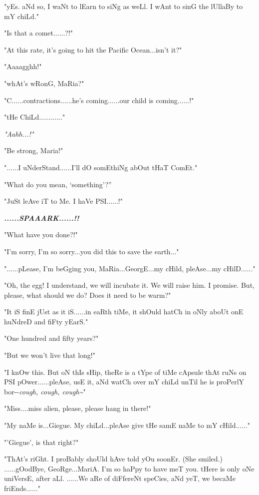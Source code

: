 \documentclass[
]{article}
\begin{document}
"yEs. aNd so, I waNt to lEarn to siNg as weLl. I wAnt to sinG the
lUllaBy to mY chiLd."

"Is that a comet......?!"

"At this rate, it's going to hit the Pacific Ocean...isn't it?"

"Aaaagghh!"

"whAt's wRonG, MaRia?"

"C......contractions......he's coming......our child is coming......!"

"tHe ChiLd............"

\emph{"Aahh...!"}

"Be strong, Maria!"

"......I uNderStand......I'll dO somEthiNg abOut tHaT ComEt."

"What do you mean, `something'?''

"JuSt leAve iT to Me. I haVe PSI......!"

\emph{\textbf{......SPAAARK......!!}}

"What have you done?!"

"I'm sorry, I'm so sorry...you did this to save the earth..."

"......pLease, I'm beGging you, MaRia...GeorgE...my cHild, pleAse...my
cHilD......"

"Oh, the egg! I understand, we will incubate it. We will raise him. I
promise. But, please, what should we do? Does it need to be warm?"

"It iS finE jUst as it iS......in eaRth tiMe, it shOuld hatCh in oNly
aboUt onE huNdreD and fiFty yEarS."

"One hundred and fifty years?"

"But we won't live that long!"

"I knOw this. But oN thIs sHip, theRe is a tYpe of tiMe cApsule thAt
ruNs on PSI pOwer......pleAse, usE it, aNd watCh over mY chiLd unTil he
is proPerlY bor-\/-\emph{cough, cough, cough\textasciitilde{}}"

"Miss....miss alien, please, please hang in there!"

"My naMe is...Giegue. My chiLd...pleAse give tHe samE naMe to mY
cHild......"

"'Giegue', is that right?"

"ThAt's riGht. I proBably shoUld hAve told yOu soonEr. (She smiled.)
......gOodBye, GeoRge...MariA. I'm so haPpy to have meT you. tHere is
only oNe uniVersE, after aLl. ......We aRe of diFfereNt speCies, aNd
yeT, we becaMe friEnds......"
\end{document}
